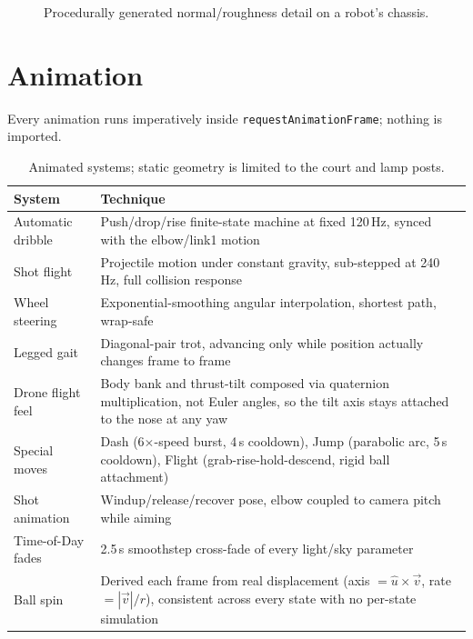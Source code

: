 \documentclass[11pt,a4paper]{article}
\newcommand{\code}[1]{\texttt{#1}}
\newcommand{\figplaceholder}[1]{%
  \fbox{\parbox{0.85\textwidth}{\centering\vspace{1em}\textcolor{red}{TODO: figure. #1}\vspace{1em}}}}
\begin{document}
\begin{figure}[htbp]
\centering
\figplaceholder{close-up of a robot body showing procedural PBR texture detail}
\caption{Procedurally generated normal/roughness detail on a robot's chassis.}
\end{figure}

\section{Animation}
\label{sec:animation}

Every animation runs imperatively inside \code{requestAnimationFrame}; nothing is imported.

\begin{table}[htbp]
\centering
\small
\begin{tabularx}{\textwidth}{l X}
\toprule
\textbf{System} & \textbf{Technique} \\
\midrule
Automatic dribble & Push/drop/rise finite-state machine at fixed 120\,Hz, synced with the elbow/link1 motion \\
Shot flight & Projectile motion under constant gravity, sub-stepped at 240\,Hz, full collision response \\
Wheel steering & Exponential-smoothing angular interpolation, shortest path, wrap-safe \\
Legged gait & Diagonal-pair trot, advancing only while position actually changes frame to frame \\
Drone flight feel & Body bank and thrust-tilt composed via quaternion multiplication, not Euler angles, so the tilt axis stays attached to the nose at any yaw \\
Special moves & Dash (6$\times$-speed burst, 4\,s cooldown), Jump (parabolic arc, 5\,s cooldown), Flight (grab-rise-hold-descend, rigid ball attachment) \\
Shot animation & Windup/release/recover pose, elbow coupled to camera pitch while aiming \\
Time-of-Day fades & 2.5\,s smoothstep cross-fade of every light/sky parameter \\
Ball spin & Derived each frame from real displacement (axis $= \hat{u} \times \vec{v}$, rate $= |\vec{v}|/r$), consistent across every state with no per-state simulation \\
\bottomrule
\end{tabularx}
\caption{Animated systems; static geometry is limited to the court and lamp posts.}
\end{table}
\end{document}
